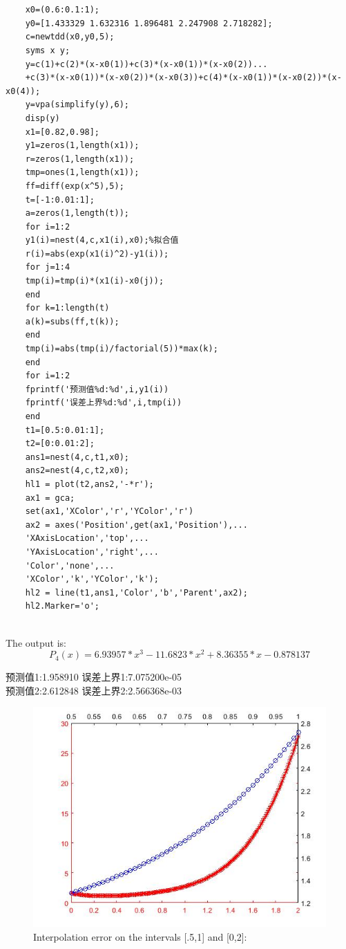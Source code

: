 \documentclass[UTF8]{ctexart}
\begin{document}
   \begin{centering}
   	\begin{lstlisting}
   	
   	
   	x0=(0.6:0.1:1);
   	y0=[1.433329 1.632316 1.896481 2.247908 2.718282];
   	c=newtdd(x0,y0,5);
   	syms x y;
   	y=c(1)+c(2)*(x-x0(1))+c(3)*(x-x0(1))*(x-x0(2))...
   	+c(3)*(x-x0(1))*(x-x0(2))*(x-x0(3))+c(4)*(x-x0(1))*(x-x0(2))*(x-x0(4));
   	y=vpa(simplify(y),6);
   	disp(y)
   	x1=[0.82,0.98];
   	y1=zeros(1,length(x1));
   	r=zeros(1,length(x1));
   	tmp=ones(1,length(x1));
   	ff=diff(exp(x^5),5);
   	t=[-1:0.01:1];
   	a=zeros(1,length(t));
   	for i=1:2
   	y1(i)=nest(4,c,x1(i),x0);%拟合值
   	r(i)=abs(exp(x1(i)^2)-y1(i));
   	for j=1:4
   	tmp(i)=tmp(i)*(x1(i)-x0(j));
   	end
   	for k=1:length(t)
   	a(k)=subs(ff,t(k));
   	end
   	tmp(i)=abs(tmp(i)/factorial(5))*max(k);
   	end 
   	for i=1:2
   	fprintf('预测值%d:%d',i,y1(i))
   	fprintf('误差上界%d:%d',i,tmp(i))
   	end
   	t1=[0.5:0.01:1];
   	t2=[0:0.01:2];
   	ans1=nest(4,c,t1,x0);
   	ans2=nest(4,c,t2,x0);
   	hl1 = plot(t2,ans2,'-*r');
   	ax1 = gca;
   	set(ax1,'XColor','r','YColor','r')
   	ax2 = axes('Position',get(ax1,'Position'),...           
   	'XAxisLocation','top',...           
   	'YAxisLocation','right',...           
   	'Color','none',...           
   	'XColor','k','YColor','k');
   	hl2 = line(t1,ans1,'Color','b','Parent',ax2);
   	hl2.Marker='o';
   	
   	\end{lstlisting}   \end{centering}
   


The output is:
$$P_4(x) = 6.93957*x^3 - 11.6823*x^2 + 8.36355*x - 0.878137$$
\begin{centering}
预测值1:1.958910 \qquad 误差上界1:7.075200e-05\\
预测值2:2.612848 \qquad 误差上界2:2.566368e-03 \\
 \end{centering}
\begin{figure}[htbp]
 \begin{center}
\includegraphics[scale=0.7]{./untitled.jpg}
\caption{Interpolation error on the intervals [.5,1] and [0,2]:}
\end{center}
\end{figure}
\end{document}
